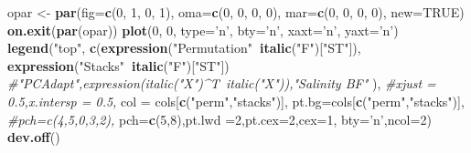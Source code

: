 \documentclass[11pt,]{article}
\newenvironment{Shaded}{\begin{snugshade}}{\end{snugshade}}
\newcommand{\KeywordTok}[1]{\textcolor[rgb]{0.13,0.29,0.53}{\textbf{#1}}}
\newcommand{\DataTypeTok}[1]{\textcolor[rgb]{0.13,0.29,0.53}{#1}}
\newcommand{\DecValTok}[1]{\textcolor[rgb]{0.00,0.00,0.81}{#1}}
\newcommand{\StringTok}[1]{\textcolor[rgb]{0.31,0.60,0.02}{#1}}
\newcommand{\CommentTok}[1]{\textcolor[rgb]{0.56,0.35,0.01}{\textit{#1}}}
\newcommand{\OtherTok}[1]{\textcolor[rgb]{0.56,0.35,0.01}{#1}}
\newcommand{\OperatorTok}[1]{\textcolor[rgb]{0.81,0.36,0.00}{\textbf{#1}}}
\newcommand{\NormalTok}[1]{#1}
\begin{document}
\begin{Shaded}
\begin{Highlighting}[]
\NormalTok{opar <-}\StringTok{ }\KeywordTok{par}\NormalTok{(}\DataTypeTok{fig=}\KeywordTok{c}\NormalTok{(}\DecValTok{0}\NormalTok{, }\DecValTok{1}\NormalTok{, }\DecValTok{0}\NormalTok{, }\DecValTok{1}\NormalTok{), }\DataTypeTok{oma=}\KeywordTok{c}\NormalTok{(}\DecValTok{0}\NormalTok{, }\DecValTok{0}\NormalTok{, }\DecValTok{0}\NormalTok{, }\DecValTok{0}\NormalTok{),}
            \DataTypeTok{mar=}\KeywordTok{c}\NormalTok{(}\DecValTok{0}\NormalTok{, }\DecValTok{0}\NormalTok{, }\DecValTok{0}\NormalTok{, }\DecValTok{0}\NormalTok{), }\DataTypeTok{new=}\OtherTok{TRUE}\NormalTok{)}
\KeywordTok{on.exit}\NormalTok{(}\KeywordTok{par}\NormalTok{(opar))}
\KeywordTok{plot}\NormalTok{(}\DecValTok{0}\NormalTok{, }\DecValTok{0}\NormalTok{, }\DataTypeTok{type=}\StringTok{'n'}\NormalTok{, }\DataTypeTok{bty=}\StringTok{'n'}\NormalTok{, }\DataTypeTok{xaxt=}\StringTok{'n'}\NormalTok{, }\DataTypeTok{yaxt=}\StringTok{'n'}\NormalTok{)}
\KeywordTok{legend}\NormalTok{(}\StringTok{"top"}\NormalTok{,}
       \KeywordTok{c}\NormalTok{(}\KeywordTok{expression}\NormalTok{(}\StringTok{"Permutation"}\OperatorTok{~}\KeywordTok{italic}\NormalTok{(}\StringTok{"F"}\NormalTok{)[}\StringTok{"ST"}\NormalTok{]),}
         \KeywordTok{expression}\NormalTok{(}\StringTok{"Stacks"}\OperatorTok{~}\KeywordTok{italic}\NormalTok{(}\StringTok{"F"}\NormalTok{)[}\StringTok{"ST"}\NormalTok{])}
         \CommentTok{#"PCAdapt",expression(italic("X")^T~italic("X")),"Salinity BF"}
\NormalTok{         ),}
       \CommentTok{#xjust = 0.5,x.intersp = 0.5,}
       \DataTypeTok{col =}\NormalTok{ cols[}\KeywordTok{c}\NormalTok{(}\StringTok{"perm"}\NormalTok{,}\StringTok{"stacks"}\NormalTok{)],}
       \DataTypeTok{pt.bg=}\NormalTok{cols[}\KeywordTok{c}\NormalTok{(}\StringTok{"perm"}\NormalTok{,}\StringTok{"stacks"}\NormalTok{)],}
       \CommentTok{#pch=c(4,5,0,3,2),}
       \DataTypeTok{pch=}\KeywordTok{c}\NormalTok{(}\DecValTok{5}\NormalTok{,}\DecValTok{8}\NormalTok{),}\DataTypeTok{pt.lwd =}\DecValTok{2}\NormalTok{,}\DataTypeTok{pt.cex=}\DecValTok{2}\NormalTok{,}\DataTypeTok{cex=}\DecValTok{1}\NormalTok{,}
       \DataTypeTok{bty=}\StringTok{'n'}\NormalTok{,}\DataTypeTok{ncol=}\DecValTok{2}\NormalTok{)}
\KeywordTok{dev.off}\NormalTok{()}
\end{Highlighting}
\end{Shaded}
\end{document}
